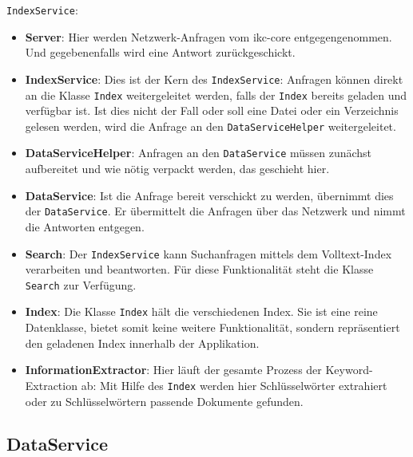 \texttt{IndexService}:
\begin{itemize}
    \item \textbf{Server}: Hier werden Netzwerk-Anfragen vom \gls{ikc-core} entgegengenommen. Und gegebenenfalls wird eine Antwort zu\-rück\-ge\-schi\-ckt.
    \item \textbf{IndexService}: Dies ist der Kern des \texttt{IndexService}: Anfragen können direkt an die Klasse \texttt{Index} weitergeleitet werden, falls der \texttt{Index} bereits geladen und verfügbar ist. Ist dies nicht der Fall oder soll eine Datei oder ein Verzeichnis gelesen werden, wird die Anfrage an den \texttt{DataServiceHelper} weitergeleitet.
    \item \textbf{DataServiceHelper}: Anfragen an den \texttt{DataService} müssen zu\-nä\-chst aufbereitet und wie nötig verpackt werden, das geschieht hier.
    \item \textbf{DataService}: Ist die Anfrage bereit verschickt zu werden, üb\-er\-ni\-mmt dies der \texttt{DataService}. Er übermittelt die Anfragen über das Netzwerk und nimmt die Antworten entgegen.
    \item \textbf{Search}: Der \texttt{IndexService} kann Suchanfragen mittels dem Voll\-te\-xt-Index verarbeiten und beantworten. Für diese Funktionalität steht die Klasse \texttt{Search} zur Verfügung.
    \item \textbf{Index}: Die Klasse \texttt{Index} hält die verschiedenen Index. Sie ist eine reine Datenklasse, bietet somit keine weitere Funktionalität, sondern repräsentiert den geladenen Index innerhalb der Applikation.
    \item \textbf{InformationExtractor}: Hier läuft der gesamte Prozess der Key\-wo\-rd-\-Ex\-trac\-ti\-on ab: Mit Hilfe des \texttt{Index} werden hier Schlüs\-sel\-wör\-ter extrahiert oder zu Schlü\-ssel\-wör\-tern passende Dokumente gefunden.
\end{itemize}

\subsection{DataService}

